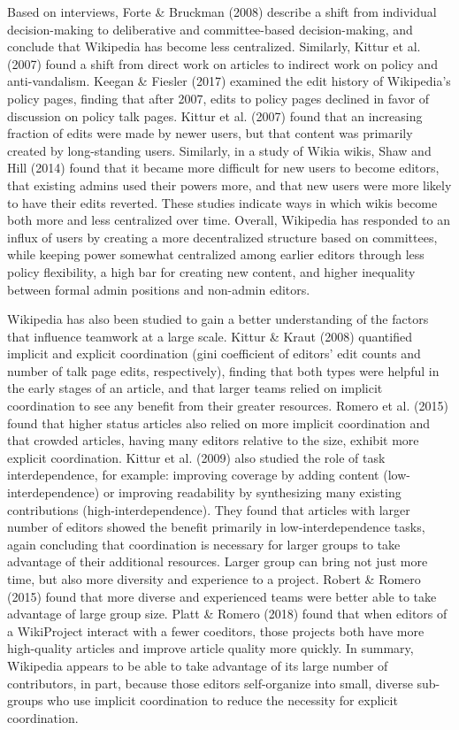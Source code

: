 Based on interviews, Forte \& Bruckman (2008) describe a shift from individual decision-making to deliberative and committee-based decision-making, and conclude that Wikipedia has become less centralized. Similarly, Kittur et al. (2007) found a shift from direct work on articles to indirect work on policy and anti-vandalism. Keegan \& Fiesler (2017) examined the edit history of Wikipedia’s policy pages, finding that after 2007, edits to policy pages declined in favor of discussion on policy talk pages. Kittur et al. (2007) found that an increasing fraction of edits were made by newer users, but that content was primarily created by long-standing users. Similarly, in a study of Wikia wikis, Shaw and Hill (2014) found that it became more difficult for new users to become editors, that existing admins used their powers more, and that new users were more likely to have their edits reverted. These studies indicate ways in which wikis become both more and less centralized over time. Overall, Wikipedia has responded to an influx of users by creating a more decentralized structure based on committees, while keeping power somewhat centralized among earlier editors through less policy flexibility, a high bar for creating new content, and higher inequality between formal admin positions and non-admin editors.

Wikipedia has also been studied to gain a better understanding of the factors that influence teamwork at a large scale. Kittur \& Kraut (2008) quantified implicit and explicit coordination (gini coefficient of editors’ edit counts and number of talk page edits, respectively), finding that both types were helpful in the early stages of an article, and that larger teams relied on implicit coordination to see any benefit from their greater resources. Romero et al. (2015) found that higher status articles also relied on more implicit coordination and that crowded articles, having many editors relative to the size, exhibit more explicit coordination. Kittur et al. (2009) also studied the role of task interdependence, for example: improving coverage by adding content (low-interdependence) or improving readability by synthesizing many existing contributions (high-interdependence). They found that articles with larger number of editors showed the benefit primarily in low-interdependence tasks, again concluding that coordination is necessary for larger groups to take advantage of their additional resources. Larger group can bring not just more time, but also more diversity and experience to a project. Robert \& Romero (2015) found that more diverse and experienced teams were better able to take advantage of large group size. Platt \& Romero (2018) found that when editors of a WikiProject interact with a fewer coeditors, those projects both have more high-quality articles and improve article quality more quickly. In summary, Wikipedia appears to be able to take advantage of its large number of contributors, in part, because those editors self-organize into small, diverse sub-groups who use implicit coordination to reduce the necessity for explicit coordination.

